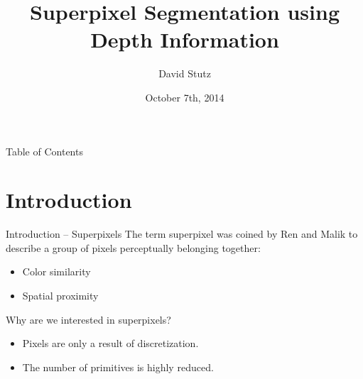\documentclass[handout]{beamer}
\title{Superpixel Segmentation using Depth Information}
\author{David Stutz}
\date{October 7th, 2014}
\begin{document}
	\RWTHtitle

	\begin{frame}{Table of Contents}
		\tableofcontents
	\end{frame}

	\section{Introduction}
	\begin{frame}{Introduction -- Superpixels}
		The term superpixel was coined by Ren and Malik \cite{RenMalik:2003} to describe a group of pixels perceptually belonging together:
		\vskip 0.25cm
		\begin{itemize}[label=--]
			\item Color similarity
			\item Spatial proximity
		\end{itemize}
		\vskip 0.5cm
		\pause
		
		Why are we interested in superpixels?
		\vskip 0.25cm
		\begin{itemize}[label=--]
			\item Pixels are only a result of discretization.
			\item The number of primitives is highly reduced.
		\end{itemize}
		\vskip 0.5cm
	\end{frame}
	
%	
	
\end{document}
